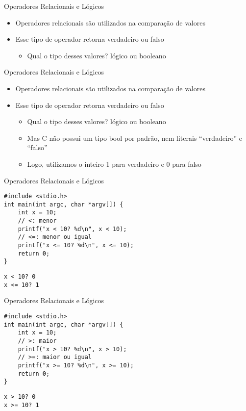 \documentclass[t, aspectratio=169]{beamer}
\begin{document}
\begin{frame}[label={sec:org054cfe5}]{Operadores Relacionais e Lógicos}
\begin{itemize}
\item Operadores relacionais são utilizados na comparação de valores
\item Esse tipo de operador retorna \alert{verdadeiro} ou \alert{falso}
\begin{itemize}
\item Qual o tipo desses valores? \alert{lógico} ou \alert{booleano}
\end{itemize}
\end{itemize}
\end{frame}

\begin{frame}[label={sec:org1b89c1b}]{Operadores Relacionais e Lógicos}
\begin{itemize}
\item Operadores relacionais são utilizados na comparação de valores
\item Esse tipo de operador retorna \alert{verdadeiro} ou \alert{falso}
\begin{itemize}
\item Qual o tipo desses valores? \alert{lógico} ou \alert{booleano}
\item Mas C não possui um tipo \alert{bool} por padrão, nem literais ``verdadeiro'' e ``falso''
\item Logo, utilizamos o inteiro \alert{1} para verdadeiro e \alert{0} para falso
\end{itemize}
\end{itemize}
\end{frame}

\begin{frame}[label={sec:org990a80e},fragile]{Operadores Relacionais e Lógicos}
 \vspace{-0.5cm}
\begin{verbatim}
#include <stdio.h>
int main(int argc, char *argv[]) {
    int x = 10;
    // <: menor
    printf("x < 10? %d\n", x < 10);
    // <=: menor ou igual
    printf("x <= 10? %d\n", x <= 10);
    return 0;
}
\end{verbatim}

\begin{verbatim}
x < 10? 0
x <= 10? 1
\end{verbatim}
\end{frame}

\begin{frame}[label={sec:org0d13d02},fragile]{Operadores Relacionais e Lógicos}
 \vspace{-0.5cm}
\begin{verbatim}
#include <stdio.h>
int main(int argc, char *argv[]) {
    int x = 10;
    // >: maior
    printf("x > 10? %d\n", x > 10);
    // >=: maior ou igual
    printf("x >= 10? %d\n", x >= 10);
    return 0;
}
\end{verbatim}

\begin{verbatim}
x > 10? 0
x >= 10? 1
\end{verbatim}
\end{frame}
\end{document}
